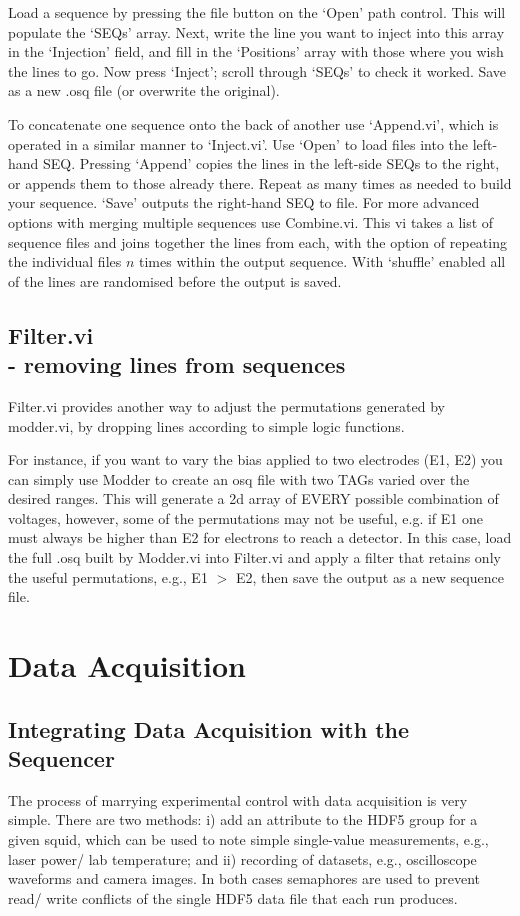 \documentclass[10pt,a4paper]{article}
\begin{document}
Load a sequence by pressing the file button on the `Open' path control.  This will populate the `SEQs' array.  Next, write the line you want to inject into this array in the `Injection' field, and fill in the `Positions' array with those where you wish the lines to go.  Now press `Inject'; scroll through `SEQs'  to check it worked.  Save as a new .osq file (or overwrite the original).

To concatenate one sequence onto the back of another use `Append.vi', which is operated in a  similar manner to `Inject.vi'.  Use `Open' to load files into the left-hand SEQ. Pressing `Append' copies the lines in the left-side SEQs to the right, or appends them to those already there.  Repeat as many times as needed to build your sequence. `Save' outputs the right-hand SEQ to file. For more advanced options with merging multiple sequences use Combine.vi. This vi takes a list of sequence files and joins together the lines from each, with the option of repeating the individual files $n$ times within the output sequence.  With `shuffle' enabled all of the lines are randomised before the output is saved.

\subsection[Filter.vi]{Filter.vi\\ %
	\normalsize - removing lines from sequences}
Filter.vi provides another way to adjust the permutations generated by modder.vi, by dropping lines according to simple logic functions.  

For instance, if you want to vary the bias applied to two electrodes (E1, E2) you can simply use Modder to create an osq file with two TAGs varied over the desired ranges.  This will generate a 2d array of EVERY possible combination of voltages, however, some of the permutations may not be useful, e.g. if E1 one must always be higher than E2 for electrons to reach a detector.  In this case, load the full .osq built by Modder.vi into Filter.vi and apply a filter that retains only the useful permutations, e.g., E1 $>$ E2, then save the output as a new sequence file.

\section{Data Acquisition}
\subsection{Integrating Data Acquisition with the Sequencer}
The process of marrying experimental control with data acquisition is very simple.  There are two methods: i) add an attribute to the HDF5 group for a given squid, which can be used to note simple single-value measurements, e.g., laser power/ lab temperature; and ii) recording of datasets, e.g., oscilloscope waveforms and camera images.  In both cases semaphores are used to prevent read/ write conflicts of the single HDF5 data file that each run produces.
\end{document}
